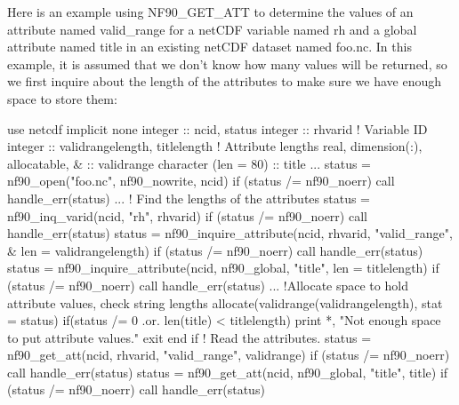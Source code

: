 Here is an example using N\+F90\+\_\+\+G\+E\+T\+\_\+\+A\+TT to determine the values of an attribute named valid\+\_\+range for a net\+C\+DF variable named rh and a global attribute named title in an existing net\+C\+DF dataset named foo.\+nc. In this example, it is assumed that we don’t know how many values will be returned, so we first inquire about the length of the attributes to make sure we have enough space to store them\+:


\begin{DoxyCode}
\textcolor{keywordtype}{use }netcdf
\textcolor{keywordtype}{implicit none}
\textcolor{keywordtype}{integer}              :: ncid, status
\textcolor{keywordtype}{integer}              :: rhvarid                       \textcolor{comment}{! Variable ID}
\textcolor{keywordtype}{integer}              :: validrangelength, titlelength \textcolor{comment}{! Attribute lengths}
\textcolor{keywordtype}{real}, \textcolor{keywordtype}{dimension(:)}, \textcolor{keywordtype}{allocatable}, &
                     :: validrange
\textcolor{keywordtype}{character (len = 80)} :: title
...
status = nf90\_open(\textcolor{stringliteral}{"foo.nc"}, nf90\_nowrite, ncid)
\textcolor{keywordflow}{if} (status /= nf90\_noerr) \textcolor{keyword}{call }handle\_err(status)
...
\textcolor{comment}{! Find the lengths of the attributes}
status = nf90\_inq\_varid(ncid, \textcolor{stringliteral}{"rh"}, rhvarid)
\textcolor{keywordflow}{if} (status /= nf90\_noerr) \textcolor{keyword}{call }handle\_err(status)
status = nf90\_inquire\_attribute(ncid, rhvarid, \textcolor{stringliteral}{"valid\_range"}, &
                          len = validrangelength)
\textcolor{keywordflow}{if} (status /= nf90\_noerr) \textcolor{keyword}{call }handle\_err(status)
status = nf90\_inquire\_attribute(ncid, nf90\_global, \textcolor{stringliteral}{"title"}, len = titlelength)
\textcolor{keywordflow}{if} (status /= nf90\_noerr) \textcolor{keyword}{call }handle\_err(status)
...
\textcolor{comment}{!Allocate space to hold attribute values, check string lengths}
\textcolor{keyword}{allocate}(validrange(validrangelength), stat = status)
\textcolor{keywordflow}{if}(status /= 0 .or. len(title) < titlelength)
  print *, \textcolor{stringliteral}{"Not enough space to put attribute values."}
  \textcolor{keywordflow}{exit}
\textcolor{keywordflow}{end if}
\textcolor{comment}{! Read the attributes.}
status = nf90\_get\_att(ncid, rhvarid, \textcolor{stringliteral}{"valid\_range"}, validrange)
\textcolor{keywordflow}{if} (status /= nf90\_noerr) \textcolor{keyword}{call }handle\_err(status)
status = nf90\_get\_att(ncid, nf90\_global, \textcolor{stringliteral}{"title"}, title)
\textcolor{keywordflow}{if} (status /= nf90\_noerr) \textcolor{keyword}{call }handle\_err(status)
\end{DoxyCode}
